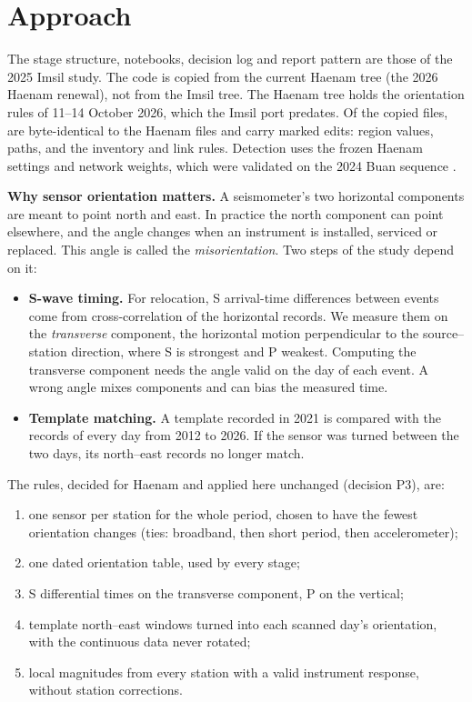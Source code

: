 \documentclass[11pt,a4paper]{article}
\begin{document}
\section{Approach}

The stage structure, notebooks, decision log and report pattern are those of the 2025 Imsil study. The code is copied from the current Haenam tree (the 2026 Haenam renewal), not from the Imsil tree. The Haenam tree holds the orientation rules of 11--14 October 2026, which the Imsil port predates. Of the copied files,  are byte-identical to the Haenam files and  carry marked edits: region values, paths, and the inventory and link rules. Detection uses the frozen Haenam settings and network weights, which were validated on the 2024 Buan sequence \citep{Seo2025}.

\textbf{Why sensor orientation matters.} A seismometer's two horizontal components are meant to point north and east. In practice the north component can point elsewhere, and the angle changes when an instrument is installed, serviced or replaced. This angle is called the \emph{misorientation}. Two steps of the study depend on it:
\begin{itemize}
\item \textbf{S-wave timing.} For relocation, S arrival-time differences between events come from cross-correlation of the horizontal records. We measure them on the \emph{transverse} component, the horizontal motion perpendicular to the source--station direction, where S is strongest and P weakest. Computing the transverse component needs the angle valid on the day of each event. A wrong angle mixes components and can bias the measured time.
\item \textbf{Template matching.} A template recorded in 2021 is compared with the records of every day from 2012 to 2026. If the sensor was turned between the two days, its north--east records no longer match.
\end{itemize}
The rules, decided for Haenam and applied here unchanged (decision P3), are:
\begin{enumerate}
\item one sensor per station for the whole period, chosen to have the fewest orientation changes (ties: broadband, then short period, then accelerometer);
\item one dated orientation table, used by every stage;
\item S differential times on the transverse component, P on the vertical;
\item template north--east windows turned into each scanned day's orientation, with the continuous data never rotated;
\item local magnitudes from every station with a valid instrument response, without station corrections.
\end{enumerate}
\end{document}
